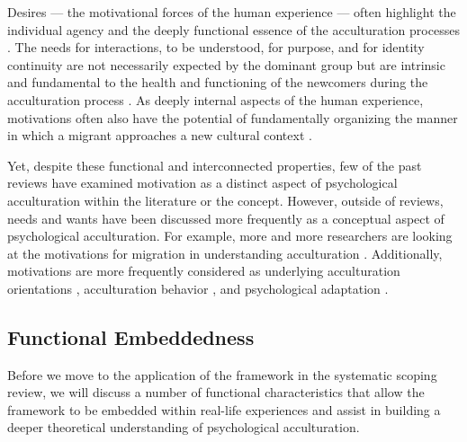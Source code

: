 \documentclass[man, 12pt, a4paper, mask]{apa7}
\begin{document}
Desires --- the motivational forces of the human experience --- often highlight the individual agency and the deeply functional essence of the acculturation processes \citep[][]{gezentsvey2008}. The needs for interactions, to be understood, for purpose, and for identity continuity are not necessarily expected by the dominant group but are intrinsic and fundamental to the health and functioning of the newcomers during the acculturation process \citep[e.g.,][]{Anzaldua1987}. As deeply internal aspects of the human experience, motivations often also have the potential of fundamentally organizing the manner in which a migrant approaches a new cultural context \citep[][]{vishkin2021, kashima2014}. 

Yet, despite these functional and interconnected properties, few of the past reviews have examined motivation as a distinct aspect of psychological acculturation within the literature or the concept. However, outside of reviews, needs and wants have been discussed more frequently as a conceptual aspect of psychological acculturation. For example, more and more researchers are looking at the motivations for migration in understanding acculturation \citep{Sandu2018, Echterhoff2020}. Additionally, motivations are more frequently considered as underlying  acculturation orientations \citep{Recker2017a}, acculturation behavior \citep{Reece2000}, and psychological adaptation \citep{Safdar2003}. 

\subsection{Functional Embeddedness}
Before we move to the application of the framework in the systematic scoping review, we will discuss a number of functional characteristics that allow the framework to be embedded within real-life experiences and assist in building a deeper theoretical understanding of psychological acculturation.
\end{document}
